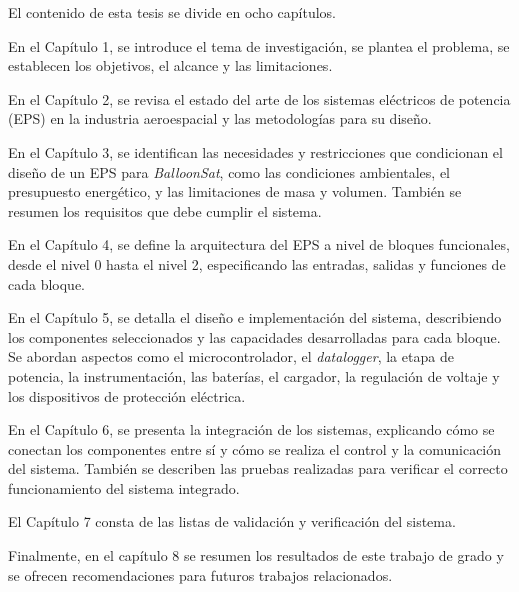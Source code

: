 El contenido de esta tesis se divide en ocho capítulos.

En el Capítulo 1, se introduce el tema de investigación, se plantea el problema, se establecen los objetivos, el alcance y las limitaciones.

En el Capítulo 2, se revisa el estado del arte de los sistemas eléctricos de potencia (EPS) en la industria aeroespacial y las metodologías para su diseño.

En el Capítulo 3, se identifican las necesidades y restricciones que condicionan el diseño de un EPS para \emph{BalloonSat}, como las condiciones ambientales, el presupuesto energético, y las limitaciones de masa y volumen. También se resumen los requisitos que debe cumplir el sistema.

En el Capítulo 4, se define la arquitectura del EPS a nivel de bloques funcionales, desde el nivel 0 hasta el nivel 2, especificando las entradas, salidas y funciones de cada bloque.

En el Capítulo 5, se detalla el diseño e implementación del sistema, describiendo los componentes seleccionados y las capacidades desarrolladas para cada bloque. Se abordan aspectos como el microcontrolador, el \emph{datalogger}, la etapa de potencia, la instrumentación, las baterías, el cargador, la regulación de voltaje y los dispositivos de protección eléctrica.

En el Capítulo 6, se presenta la integración de los sistemas, explicando cómo se conectan los componentes entre sí y cómo se realiza el control y la comunicación del sistema. También se describen las pruebas realizadas para verificar el correcto funcionamiento del sistema integrado.

El Capítulo 7 consta de las listas de validación y verificación del sistema.

Finalmente, en el capítulo 8 se resumen los resultados de este trabajo de grado y se ofrecen recomendaciones para futuros trabajos relacionados.








